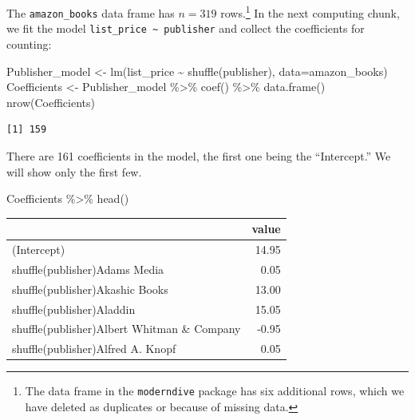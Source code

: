 \documentclass[
  letterpaper,
  DIV=11,
  numbers=noendperiod,
  oneside]{scrreprt}
\newenvironment{Shaded}{\begin{snugshade}}{\end{snugshade}}
\newcommand{\AttributeTok}[1]{\textcolor[rgb]{0.40,0.45,0.13}{#1}}
\newcommand{\FunctionTok}[1]{\textcolor[rgb]{0.28,0.35,0.67}{#1}}
\newcommand{\NormalTok}[1]{\textcolor[rgb]{0.00,0.23,0.31}{#1}}
\newcommand{\OtherTok}[1]{\textcolor[rgb]{0.00,0.23,0.31}{#1}}
\newcommand{\SpecialCharTok}[1]{\textcolor[rgb]{0.37,0.37,0.37}{#1}}
\begin{document}
\begin{tcolorbox}[enhanced jigsaw, colbacktitle=quarto-callout-warning-color!10!white, breakable, opacitybacktitle=0.6, colback=white, left=2mm, arc=.35mm, colframe=quarto-callout-warning-color-frame, coltitle=black, toprule=.15mm, opacityback=0, leftrule=.75mm, bottomtitle=1mm, toptitle=1mm, titlerule=0mm, title=\textcolor{quarto-callout-warning-color}{\faExclamationTriangle}\hspace{0.5em}{Demonstration: Counting coefficients}, rightrule=.15mm, bottomrule=.15mm]

The \texttt{amazon\_books} data frame has \(n=319\) rows.\footnote{The
  data frame in the \texttt{moderndive} package has six additional rows,
  which we have deleted as duplicates or because of missing data.} In
the next computing chunk, we fit the model
\texttt{list\_price\ \textasciitilde{}\ publisher} and collect the
coefficients for counting:

\begin{Shaded}
\begin{Highlighting}[]
\NormalTok{Publisher\_model }\OtherTok{\textless{}{-}} \FunctionTok{lm}\NormalTok{(list\_price }\SpecialCharTok{\textasciitilde{}} \FunctionTok{shuffle}\NormalTok{(publisher),}
                      \AttributeTok{data=}\NormalTok{amazon\_books)}
\NormalTok{Coefficients }\OtherTok{\textless{}{-}}\NormalTok{ Publisher\_model }\SpecialCharTok{\%\textgreater{}\%} \FunctionTok{coef}\NormalTok{() }\SpecialCharTok{\%\textgreater{}\%} \FunctionTok{data.frame}\NormalTok{()}
\FunctionTok{nrow}\NormalTok{(Coefficients)}
\end{Highlighting}
\end{Shaded}

\begin{verbatim}
[1] 159
\end{verbatim}

There are 161 coefficients in the model, the first one being the
``Intercept.'' We will show only the first few.

\begin{Shaded}
\begin{Highlighting}[]
\NormalTok{Coefficients }\SpecialCharTok{\%\textgreater{}\%} \FunctionTok{head}\NormalTok{()}
\end{Highlighting}
\end{Shaded}

\ttfamily 
\begin{tabular}{lr}
\toprule
  & value\\
\midrule
(Intercept) & 14.95\\
shuffle(publisher)Adams Media & 0.05\\
shuffle(publisher)Akashic Books & 13.00\\
shuffle(publisher)Aladdin & 15.05\\
shuffle(publisher)Albert Whitman \& Company & -0.95\\
\addlinespace
shuffle(publisher)Alfred A. Knopf & 0.05\\
\bottomrule
\end{tabular} \normalfont
\bigskip


\end{tcolorbox}
\end{document}
